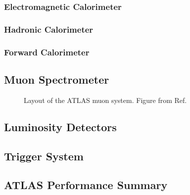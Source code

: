 \subsubsection*{Electromagnetic Calorimeter}


\subsubsection*{Hadronic Calorimeter}


\subsubsection*{Forward Calorimeter}


\subsection{Muon Spectrometer}

\begin{figure}[ht]
\centering
{}
\caption{Layout of the ATLAS muon system. Figure from Ref. \cite{atlas:atlas}}
\label{fig:atlas:muon}
\end{figure}

\subsection{Luminosity Detectors}

\subsection{Trigger System}
\label{sec:cern:trigger}

\subsection{ATLAS Performance Summary}

